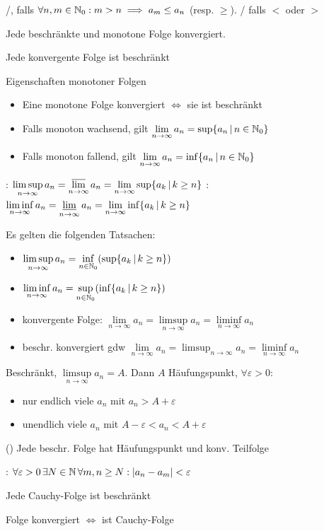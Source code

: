 \Def {}/,
falls $\forall n,m \in \mathbb{N}_0 : m > n \implies a_m\le a_n$ (resp. $\geq$).
/ falls $<$ oder $>$

\Satz Jede beschränkte und monotone Folge konvergiert.

\Satz Jede konvergente Folge ist beschränkt

\Satz Eigenschaften monotoner Folgen
\vspace{-0.6em}
\begin{itemize}
    \item Eine monotone Folge konvergiert $\iff$ sie ist beschränkt
    \item Falls monoton wachsend, gilt $\lim\limits_{n\to\infty}a_n = \sup\{a_n \, | \, n \in \mathbb{N}_0\}$
    \item Falls monoton fallend, gilt $\lim\limits_{n\to\infty}a_n = \inf\{a_n \, | \, n \in \mathbb{N}_0\}$
\end{itemize}

\Def {}: $\limsup\limits_{n\to\infty} a_n = \varlimsup\limits_{n\to\infty} a_n = \lim\limits_{n\to\infty} \sup\{a_k \, | \, k\ge n\}$
: $\liminf\limits_{n\to\infty} a_n = \varliminf\limits_{n \to \infty} a_n = \lim\limits_{n\to\infty} \inf\{a_k \, | \, k\ge n\}$

\Satz Es gelten die folgenden Tatsachen:
\vspace{-0.6em}
\begin{itemize}
    \item $\limsup\limits_{n\to\infty} a_n = \inf\limits_{n\in\mathbb{N}_0}(\sup\{a_k \, | \, k\ge n\})$
    \item $\liminf\limits_{n\to\infty} a_n = \sup\limits_{n\in\mathbb{N}_0}(\inf\{a_k \, | \, k\ge n\})$
    \item konvergente Folge: $\lim\limits_{n\to\infty} a_n = \limsup\limits_{n\to\infty} a_n = \liminf\limits_{n\to\infty} a_n$
    \item beschr. konvergiert gdw $\lim\limits_{n\to\infty}a_n = \limsup_{n\to\infty} a_n = \liminf\limits_{n\to\infty} a_n$
\end{itemize}

\Satz Beschränkt, $\limsup\limits_{n\to\infty}a_n = A$. Dann $A$ Häufungspunkt,  $\forall\varepsilon > 0$:
\vspace{-0.6em}
\begin{itemize}
    \item nur endlich viele $a_n$ mit $a_n > A + \varepsilon$
    \item unendlich viele $a_n$ mit $A - \varepsilon < a_n < A + \varepsilon$
\end{itemize}

\Kor () Jede beschr. Folge hat Häufungspunkt und konv. Teilfolge

\Def {}: $\forall \varepsilon > 0 \, \exists N \in \mathbb{N} \, \forall m, n\ge N : |a_n - a_m| < \varepsilon$

\Satz Jede Cauchy-Folge ist beschränkt

\Satz Folge konvergiert $\iff$ ist Cauchy-Folge
